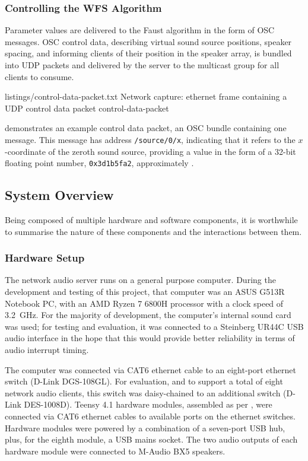 \subsubsection{Controlling the WFS Algorithm}

Parameter values are delivered to the Faust algorithm in the form of OSC
messages.
OSC control data, describing virtual sound source positions, speaker spacing,
and informing clients of their position in the speaker array, is bundled into
UDP packets and delivered by the server to the multicast group for all clients
to consume.

{listings/control-data-packet.txt}
{Network capture: ethernet frame containing a UDP control data packet}
{control-data-packet}

 demonstrates an example control data
packet, an OSC bundle containing one message.
This message has address \texttt{/source/0/x}, indicating that it refers to the
$x$-coordinate of the zeroth sound source, providing a value in the form of a
32-bit floating point number, \texttt{0x3d1b5fa2}, approximately
.

\subsection{System Overview}\label{subsec:system-overview}

Being composed of multiple hardware and software components, it is worthwhile
to summarise the nature of these components and the interactions between them.

\subsubsection{Hardware Setup}

The network audio server runs on a general purpose computer.
During the development and testing of this project, that computer was an ASUS
G513R Notebook PC, with an AMD Ryzen 7 6800H processor with a clock
speed of \qty{3.2}{\GHz}.
For the majority of development, the computer's internal sound card was used;
for testing and evaluation, it was connected to a Steinberg UR44C USB audio
interface in the hope that this would provide better reliability in terms of
audio interrupt timing.

The computer was connected via CAT6 ethernet cable to an eight-port ethernet
switch (D-Link DGS-108GL).
For evaluation, and to support a total of eight network audio clients, this
switch was daisy-chained to an additional switch (D-Link DES-1008D).
Teensy 4.1 hardware modules, assembled as per , were
connected via CAT6 ethernet cables to available ports on the ethernet switches.
Hardware modules were powered by a combination of a seven-port USB hub, plus,
for the eighth module, a USB mains socket.
The two audio outputs of each hardware module were connected to M-Audio BX5
speakers.

